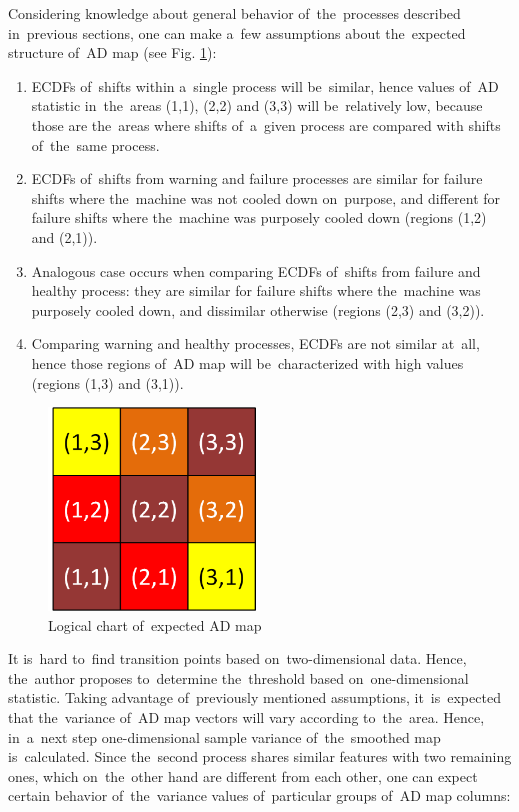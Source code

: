Considering knowledge about general behavior of~the~processes described in~previous sections, one can make a~few assumptions about the~expected structure of~AD map (see Fig. \ref{fig:map}):
\begin{enumerate}
\item ECDFs of~shifts within a~single process will be~similar, hence values of~AD statistic in~the~areas (1,1), (2,2) and (3,3) will be~relatively low, because those are the~areas where shifts of~a~given process are compared with shifts of~the~same process. 
\item ECDFs of~shifts from warning and failure processes are similar for failure shifts where the~machine was not cooled down on~purpose, and different for failure shifts where the~machine was purposely cooled down (regions (1,2) and (2,1)).
\item Analogous case occurs when comparing ECDFs of~shifts from failure and healthy process: they are similar for failure shifts where the~machine was purposely cooled down, and dissimilar otherwise (regions (2,3) and (3,2)).
\item Comparing warning and healthy processes, ECDFs are not similar at~all, hence those regions of~AD map will be~characterized with high values (regions (1,3) and (3,1)).
\end{enumerate}

\begin{figure}[ht!]
\centering
\includegraphics[width=0.5\textwidth]{wykresy/map.png}
\caption{Logical chart of~expected AD map}
\label{fig:map}
\end{figure}

It is~hard to~find transition points based on~two-dimensional data. Hence, the~author proposes to~determine the~threshold based on~one-dimensional statistic. Taking advantage of~previously mentioned assumptions, it~is~expected that the~variance of~AD map vectors will vary according to~the~area. Hence, in~a~next step one-dimensional sample variance of~the~smoothed map is~calculated. Since the~second process shares similar features with two remaining ones, which on~the~other hand are different from each other, one can expect certain behavior of~the~variance values of~particular groups of~AD map columns:

